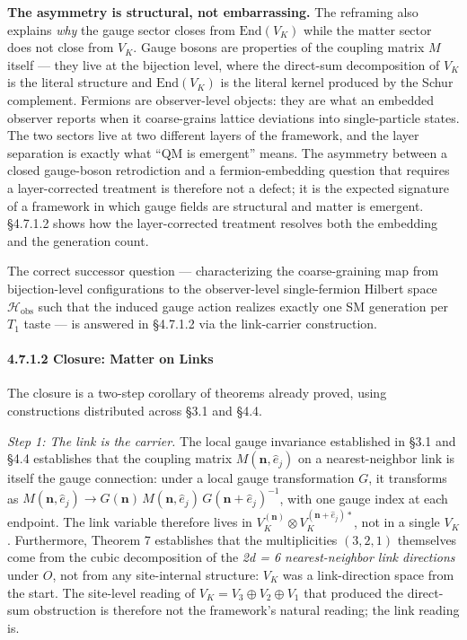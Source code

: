 \documentclass[
]{article}
\begin{document}
\textbf{The asymmetry is structural, not embarrassing.} The reframing
also explains \emph{why} the gauge sector closes from
\(\mathrm{End}(V_K)\) while the matter sector does not close from
\(V_K\). Gauge bosons are properties of the coupling matrix \(M\) itself
--- they live at the bijection level, where the direct-sum decomposition
of \(V_K\) is the literal structure and \(\mathrm{End}(V_K)\) is the
literal kernel produced by the Schur complement. Fermions are
observer-level objects: they are what an embedded observer reports when
it coarse-grains lattice deviations into single-particle states. The two
sectors live at two different layers of the framework, and the layer
separation is exactly what ``QM is emergent'' means. The asymmetry
between a closed gauge-boson retrodiction and a fermion-embedding
question that requires a layer-corrected treatment is therefore not a
defect; it is the expected signature of a framework in which gauge
fields are structural and matter is emergent. §4.7.1.2 shows how the
layer-corrected treatment resolves both the embedding and the generation
count.

The correct successor question --- characterizing the coarse-graining
map from bijection-level configurations to the observer-level
single-fermion Hilbert space \(\mathcal{H}_{\text{obs}}\) such that the
induced gauge action realizes exactly one SM generation per \(T_1\)
taste --- is answered in §4.7.1.2 via the link-carrier construction.

\hypertarget{closure-matter-on-links}{%
\paragraph{4.7.1.2 Closure: Matter on
Links}\label{closure-matter-on-links}}

The closure is a two-step corollary of theorems already proved, using
constructions distributed across §3.1 and §4.4.

\emph{Step 1: The link is the carrier.} The local gauge invariance
established in §3.1 and §4.4 establishes that the coupling matrix
\(M(\mathbf{n}, \hat{e}_j)\) on a nearest-neighbor link is itself the
gauge connection: under a local gauge transformation \(G\), it
transforms as
\(M(\mathbf{n}, \hat{e}_j) \to G(\mathbf{n})\, M(\mathbf{n}, \hat{e}_j)\, G(\mathbf{n}+\hat{e}_j)^{-1}\),
with one gauge index at each endpoint. The link variable therefore lives
in \(V_K^{(\mathbf{n})} \otimes V_K^{(\mathbf{n}+\hat{e}_j)*}\), not in
a single \(V_K\). Furthermore, Theorem 7 establishes that the
multiplicities \((3, 2, 1)\) themselves come from the cubic
decomposition of the \emph{2d = 6 nearest-neighbor link directions}
under \(O\), not from any site-internal structure: \(V_K\) was a
link-direction space from the start. The site-level reading of
\(V_K = V_3 \oplus V_2 \oplus V_1\) that produced the direct-sum
obstruction is therefore not the framework's natural reading; the link
reading is.
\end{document}

